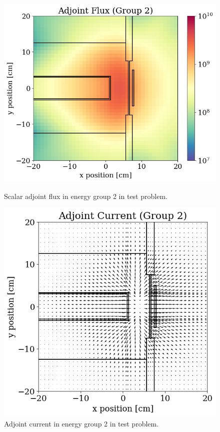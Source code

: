 \begin{figure}
  \begin{minipage}{0.54\linewidth}
    \centering
    \includegraphics[width=\linewidth]{content/testprob/scalar_flux_adj_g02.png}
    \caption{Scalar adjoint flux in energy group 2 in test problem.}
    \label{fig:tp:scalar_flux_adj_g02}
  \end{minipage}
  \hfill
  \begin{minipage}{0.45\linewidth}
    \centering
    \includegraphics[width=\linewidth]{content/testprob/current_adj_g02.png}
    \caption{Adjoint current in energy group 2 in test problem.}
    \label{fig:tp:current_adj_g02}
  \end{minipage}
\end{figure}

